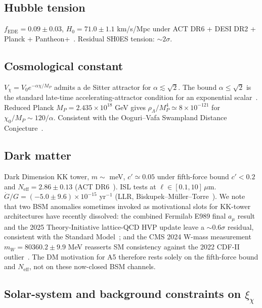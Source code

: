 \documentclass[epjc3,twocolumn]{svjour3}
\begin{document}
\subsection{Hubble tension}
$f_{\mathrm{EDE}} = 0.09 \pm 0.03$, $H_0 = 71.0 \pm 1.1$ km/s/Mpc under ACT DR6 + DESI DR2 + Planck + Pantheon+~\cite{PoulinSmith2026,Calabrese2025}. Residual SH0ES tension: $\sim 2\sigma$.

\subsection{Cosmological constant}
$V_\chi = V_0 e^{-\alpha \chi / M_P}$ admits a de Sitter attractor for $\alpha \lesssim \sqrt{2}$. The bound $\alpha \le \sqrt{2}$ is the standard late-time accelerating-attractor condition for an exponential scalar~\cite{Halliwell1987,CopelandLiddleWands1998}.
Reduced Planck $M_P = 2.435 \times 10^{18}$ GeV gives $\rho_\Lambda / M_P^4 \simeq 8 \times 10^{-121}$ for $\chi_0 / M_P \sim 120/\alpha$. Consistent with the Ooguri--Vafa Swampland Distance Conjecture~\cite{OoguriVafa2007}.

\subsection{Dark matter}
Dark Dimension KK tower, $m \sim$ meV, $c' \simeq 0.05$ under fifth-force bound $c' < 0.2$ and $N_{\mathrm{eff}} = 2.86 \pm 0.13$ (ACT DR6~\cite{Calabrese2025}). ISL tests at $\ell \in [0.1, 10] \, \mu$m. $\dot G / G = (-5.0 \pm 9.6) \times 10^{-15}$ yr$^{-1}$ (LLR, Biskupek--M\"uller--Torre~\cite{Biskupek2021}). We note that two BSM anomalies sometimes invoked as motivational slots for KK-tower architectures have recently dissolved: the combined Fermilab E989 final $a_\mu$ result and the 2025 Theory-Initiative lattice-QCD HVP update leave a $\sim 0.6\sigma$ residual, consistent with the Standard Model~\cite{MuonG2Final2025}; and the CMS 2024 W-mass measurement $m_W = 80360.2 \pm 9.9$ MeV reasserts SM consistency against the 2022 CDF-II outlier~\cite{CMSWmass2024}. The DM motivation for A5 therefore rests solely on the fifth-force bound and $N_{\mathrm{eff}}$, not on these now-closed BSM channels.

\subsection{Solar-system and background constraints on $\xi_\chi$}\label{sec:xi_constraints}
\end{document}
